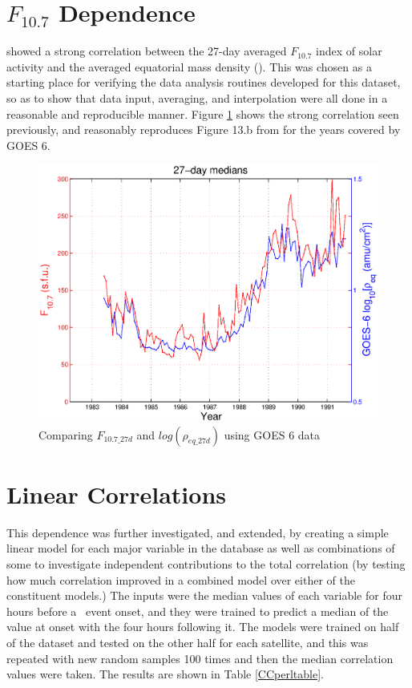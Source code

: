 \section{$F_{10.7}$ Dependence}
\cite{Takahashi2010SolarCycleVariation} showed a strong correlation between the 27-day averaged $F_{10.7}$ index of solar activity and the averaged equatorial mass density (\req). This was chosen as a starting place for verifying the data analysis routines developed for this dataset, so as to show that data input, averaging, and interpolation were all done in a reasonable and reproducible manner. Figure \ref{fig:F107rhoeq27dcomparison} shows the strong correlation seen previously, and reasonably reproduces Figure 13.b from \cite{Takahashi2010SolarCycleVariation} for the years covered by GOES 6.

\begin{figure}
\centering
\includegraphics[width=0.7\linewidth]{Figures/F107MD27d-GOES6}
\caption{Comparing $F_{10.7\_27d}$ and $log(\rho_{eq\_27d})$ using GOES 6 data }
\label{fig:F107rhoeq27dcomparison}
\end{figure}

\section{Linear Correlations}
This dependence was further investigated, and extended, by creating a simple linear model for each major variable in the database as well as combinations of some to investigate independent contributions to the total correlation (by testing how much correlation improved in a combined model over either of the constituent models.)  The inputs were the median values of each variable for four hours before a \dst\ event onset, and they were trained to predict a median of the value at onset with the four hours following it. The models were trained on half of the dataset and tested on the other half for each satellite, and this was repeated with new random samples 100 times and then the median correlation values were taken. The results are shown in Table \ref{CCperltable}.

